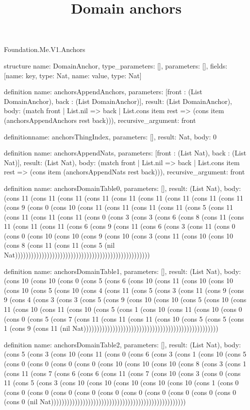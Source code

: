 \begin{lexlean}{Foundation.Me.V1.Anchors}
\title{Domain anchors}
\begin{semanticmodule}
structure{
  name: DomainAnchor,
  type_parameters: [],
  parameters: [],
  fields: [{name: key, type: Nat}, {name: value, type: Nat}]
}

definition{
  name: anchorsAppendAnchors,
  parameters: [front : (List DomainAnchor), back : (List DomainAnchor)],
  result: (List DomainAnchor),
  body: (match front
    | List.nil => back
    | List.cons item rest => (cons item (anchorsAppendAnchors rest back))),
  recursive_argument: front
}

definition{name: anchorsThingIndex, parameters: [], result: Nat, body: 0}

definition{
  name: anchorsAppendNats,
  parameters: [front : (List Nat), back : (List Nat)],
  result: (List Nat),
  body: (match front
    | List.nil => back
    | List.cons item rest => (cons item (anchorsAppendNats rest back))),
  recursive_argument: front
}

definition{
  name: anchorsDomainTable0,
  parameters: [],
  result: (List Nat),
  body: (cons 11 (cons 11 (cons 11 (cons 11 (cons 11 (cons 11 (cons 11 (cons 11 (cons 11 (cons 9 (cons 0 (cons 10 (cons 11 (cons 11 (cons 11 (cons 11 (cons 5 (cons 11 (cons 11 (cons 11 (cons 11 (cons 0 (cons 3 (cons 3 (cons 6 (cons 8 (cons 11 (cons 11 (cons 11 (cons 11 (cons 6 (cons 9 (cons 11 (cons 6 (cons 3 (cons 11 (cons 0 (cons 0 (cons 10 (cons 10 (cons 9 (cons 10 (cons 3 (cons 11 (cons 10 (cons 10 (cons 8 (cons 11 (cons 11 (cons 5 (nil Nat)))))))))))))))))))))))))))))))))))))))))))))))))))
}

definition{
  name: anchorsDomainTable1,
  parameters: [],
  result: (List Nat),
  body: (cons 10 (cons 10 (cons 0 (cons 5 (cons 6 (cons 10 (cons 11 (cons 10 (cons 10 (cons 10 (cons 5 (cons 10 (cons 4 (cons 11 (cons 5 (cons 3 (cons 11 (cons 9 (cons 9 (cons 4 (cons 3 (cons 3 (cons 5 (cons 9 (cons 10 (cons 10 (cons 5 (cons 10 (cons 11 (cons 10 (cons 11 (cons 10 (cons 5 (cons 1 (cons 10 (cons 11 (cons 10 (cons 0 (cons 0 (cons 5 (cons 7 (cons 11 (cons 11 (cons 11 (cons 10 (cons 5 (cons 5 (cons 1 (cons 9 (cons 11 (nil Nat)))))))))))))))))))))))))))))))))))))))))))))))))))
}

definition{
  name: anchorsDomainTable2,
  parameters: [],
  result: (List Nat),
  body: (cons 5 (cons 3 (cons 10 (cons 11 (cons 0 (cons 6 (cons 3 (cons 1 (cons 10 (cons 5 (cons 0 (cons 0 (cons 0 (cons 0 (cons 10 (cons 10 (cons 10 (cons 8 (cons 3 (cons 1 (cons 11 (cons 7 (cons 6 (cons 6 (cons 11 (cons 7 (cons 10 (cons 3 (cons 0 (cons 11 (cons 5 (cons 3 (cons 10 (cons 10 (cons 10 (cons 10 (cons 10 (cons 1 (cons 0 (cons 0 (cons 0 (cons 0 (cons 0 (cons 0 (cons 0 (cons 0 (cons 0 (cons 0 (cons 0 (cons 0 (nil Nat)))))))))))))))))))))))))))))))))))))))))))))))))))
}


\end{semanticmodule}
\end{lexlean}
